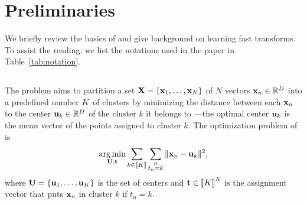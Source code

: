 
\section{Preliminaries}
\label{sec:background}
We briefly review the basics of \kmeans and give background on learning fast transforms.
To  assist  the  reading,  we  list  the notations used in the paper in Table~\ref{tab:notation}.









\subsection{\kmeans}
\label{sec:kmeans}
The \kmeans problem aims to partition a set ${\mathbf{X}}=\{{\mathbf{x}}_1,\ldots,{\mathbf{x}}_N\}$ of $N$  vectors ${\mathbf{x}}_n\in\mathbb{R}^{D}$ into a predefined number $K$ of clusters
by minimizing the distance between each ${\mathbf{x}}_n$ to the center ${\mathbf{u}}_k\in\mathbb{R}^{D}$
of the cluster $k$ it belongs to ---the optimal center ${\mathbf{u}}_k$ is the
 mean vector of the points assigned to cluster $k$.
The optimization problem of \kmeans is
\begin{equation}
\label{eq:kmean_problem}
    \operatorname*{arg\,min}_{{\mathbf{U}}, {\mathbf{t}}} \sum_{k\in\left \llbracket K\right \rrbracket} \sum_{\substack{n\\t_n = k}} \|{\mathbf{x}}_{n} -{\mathbf{u}}_{k}\|^2,
\end{equation}
where ${\mathbf{U}}=\{{\mathbf{u}}_1,\ldots,{\mathbf{u}}_K\}$ is the set of centers and ${\mathbf{t}} \in  \left \llbracket K\right \rrbracket^{N}$ is the assignment vector that puts ${\mathbf{x}}_n$ in cluster $k$
if $t_n=k$.


